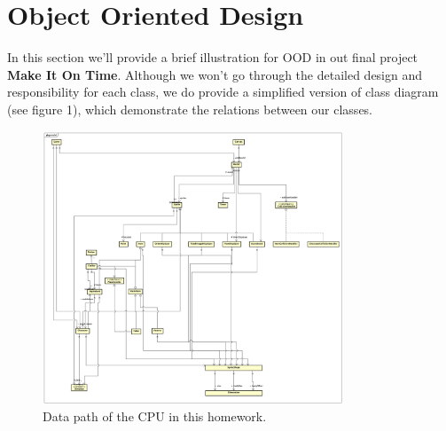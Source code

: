 \section{Object Oriented Design}
In this section we’ll provide a brief illustration for OOD in out final project \textbf{Make It On Time}. Although we won’t go through the detailed design and responsibility for each class, we do provide a simplified version of class diagram (see figure 1), which demonstrate the relations between our classes.
\begin{figure}[h!]
\centering
\includegraphics[width=0.8\textwidth]{Model_Class_Diagram}
\caption{Data path of the CPU in this homework.}
\end{figure}